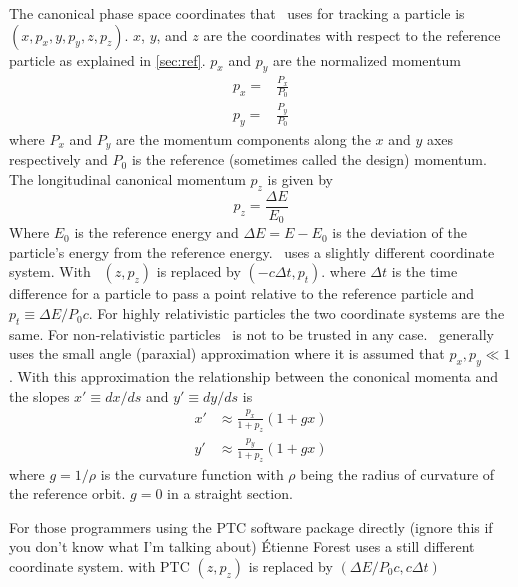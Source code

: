 The canonical phase space coordinates that \bmad\ uses for tracking a
particle is $(x, p_x, y, p_y, z, p_z)$. $x$, $y$, and $z$ are the
coordinates with respect to the reference particle as explained in
\ref{sec:ref}. $p_x$ and $p_y$ are the normalized momentum
\begin{align}
  p_x = &\frac{P_x}{P_0} \\
  p_y = &\frac{P_y}{P_0}
\end{align}
where $P_x$ and $P_y$ are the momentum components along the $x$ and
$y$ axes respectively and $P_0$ is the reference (sometimes called the
design) momentum. The longitudinal canonical momentum $p_z$ is given by
\begin{equation}
  p_z = \frac{\Delta E}{E_0}
\end{equation}
Where $E_0$ is the reference energy and $\Delta E = E - E_0$ is the
deviation of the particle's energy from the reference energy. \mad\ uses
a slightly different coordinate system. With \mad\ $(z, p_z)$ is
replaced by $(-c\Delta t, p_t)$. where $\Delta t$ is the time
difference for a particle to pass a point relative to the reference
particle and $p_t \equiv \Delta E / P_0 c$. For highly relativistic
particles the two coordinate systems are the same. For
non-relativistic particles \bmad\ is not to be trusted in any
case. \bmad\ generally uses the small angle (paraxial) approximation
where it is assumed that $p_x, p_y \ll 1$. With this approximation the
relationship between the cononical momenta and the slopes $x' \equiv dx/ds$
and $y' \equiv dy/ds$ is
\begin{align}
  x' &\approx \frac{p_x}{1 + p_z} (1 + g x) \\
  y' &\approx \frac{p_y}{1 + p_z} (1 + g x) 
\end{align}
where $g = 1/\rho$ is the curvature function with $\rho$ being the radius
of curvature of the reference orbit. $g = 0$ in a straight section.

For those programmers using the PTC software package directly (ignore
this if you don't know what I'm talking about) \'Etienne Forest uses a still
different coordinate system. with PTC $(z, p_z)$ is replaced by
$(\Delta E/P_0 c, c \Delta t)$